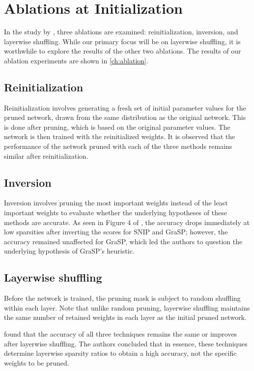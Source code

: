 \section{Ablations at Initialization}
\label{sec:ablation}
In the study by \textcite{frankle21}, three ablations are examined: reinitialization, inversion, and layerwise shuffling. While our primary focus will be on layerwise shuffling, it is worthwhile to explore the results of the other two ablations. The results of our ablation experiments are shown in \autoref{ch:ablation}.

\subsection{Reinitialization}
Reinitialization involves generating a fresh set of initial parameter values for the pruned network, drawn from the same distribution as the original network. This is done after pruning, which is based on the original parameter values. The network is then trained with the reinitialized weights. It is observed that the performance of the network pruned with each of the three methods remains similar after reinitialization.

\subsection{Inversion}
Inversion involves pruning the most important weights instead of the least important weights to evaluate whether the underlying hypotheses of these methods are accurate. As seen in Figure 4 of \textcite{frankle21}, the accuracy drops immediately at low sparsities after inverting the scores for SNIP and GraSP; however, the accuracy remained unaffected for GraSP, which led the authors to question the underlying hypothesis of GraSP's heuristic.

\subsection{Layerwise shuffling}
Before the network is trained, the pruning mask is subject to random shuffling within each layer. Note that unlike random pruning, layerwise shuffling maintains the same number of retained weights in each layer as the initial pruned network.

\textcite{frankle21} found that the accuracy of all three techniques remains the same or improves after layerwise shuffling. The authors concluded that in essence, these techniques determine layerwise sparsity ratios to obtain a high accuracy, not the specific weights to be pruned. 

